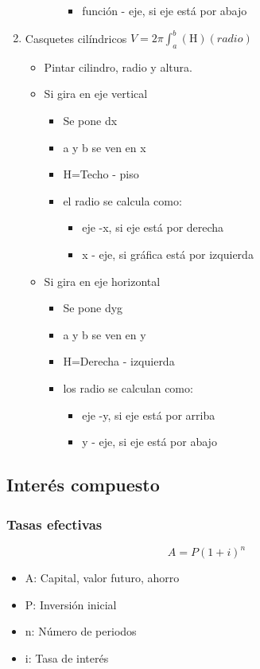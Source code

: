 \begin{enumerate}
\begin{itemize}
\begin{itemize}
\begin{itemize}
				\item función - eje, si eje está por abajo
			\end{itemize}
		\end{itemize}
	\end{itemize}
	\item Casquetes cilíndricos $V=2\pi\int_{a}^{b}(\text{H})(radio)$
	\begin{itemize}
		\item Pintar cilindro, radio y altura.
		\item Si gira en eje vertical
		\begin{itemize}
			\item Se pone dx
			\item a y b se ven en x
			\item H=Techo - piso
			\item el radio se calcula como:
			\begin{itemize}
				\item eje -x, si eje está por derecha
				\item x - eje, si gráfica está por izquierda
			\end{itemize}
		\end{itemize}
		\item Si gira en eje horizontal
		\begin{itemize}
			\item Se pone dyg
			\item a y b se ven en y
			\item H=Derecha - izquierda
			\item los radio se calculan como:
			\begin{itemize}
				\item eje -y, si eje está por arriba
				\item y - eje, si eje está por abajo
			\end{itemize}
		\end{itemize}
	\end{itemize}
\end{enumerate}

\subsection{Interés compuesto}
\subsubsection{Tasas efectivas}
$$A=P(1+i)^n$$
\begin{itemize}
	\item A: Capital, valor futuro, ahorro
	\item P: Inversión inicial
	\item n: Número de periodos
	\item i: Tasa de interés
\end{itemize}

